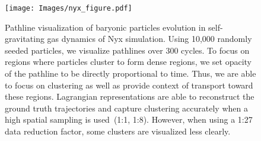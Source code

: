 \begin{figure}[!t]
\centering
\texttt{[image: Images/nyx\_figure.pdf]}
\vspace{-5mm}
\caption{Pathline visualization of baryonic particles evolution in self-gravitating gas dynamics of Nyx simulation. Using 10,000 randomly seeded particles, we visualize pathlines over 300 cycles. To focus on regions where particles cluster to form dense regions, we set opacity of the pathline to be directly proportional to time. Thus, we are able to focus on clustering as well as provide context of transport toward these regions. Lagrangian representations are able to reconstruct the ground truth trajectories and capture clustering accurately when a high spatial sampling is used~(1:1, 1:8). However, when using a 1:27 data reduction factor, some clusters are visualized less clearly.} 
\vspace{-5mm}
\label{fig:nyx_figure}
\end{figure}
